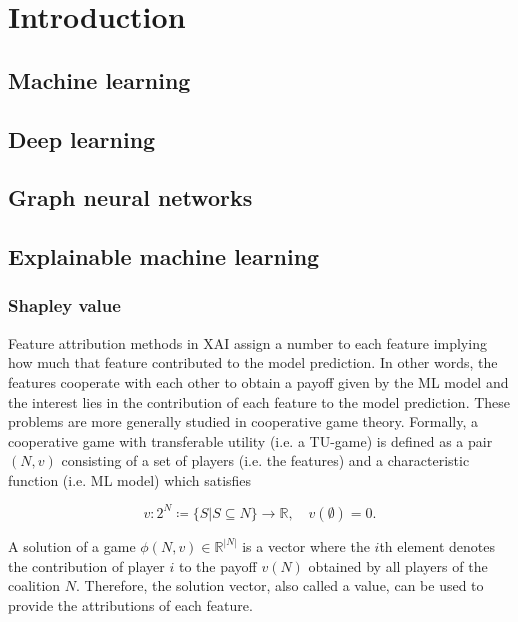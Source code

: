 \chapter{Introduction}


\section{Machine learning}

\section{Deep learning}


\section{Graph neural networks}


\section{Explainable machine learning}

\subsection{Shapley value}
\label{subsec:shapley_value}

Feature attribution methods in XAI assign a number to each feature implying how
much that feature contributed to the model prediction.\cite{merrick2020explanation}
In other words, the features cooperate with each other to obtain a payoff given
by the ML model and the interest lies in the contribution of each feature to the
model prediction. These problems are more generally studied in cooperative game
theory. Formally, a cooperative game with transferable utility (i.e. a TU-game) is
defined as a pair $(N, v)$ consisting of a set of players (i.e. the features)
and a characteristic function (i.e. ML model) which satisfies\cite{zhang2022gstarx}


\begin{equation}
	v: 2^N \coloneqq \{S | S \subseteq N\} \rightarrow \mathbb{R}, \quad v\left(\emptyset\right) = 0.
\end{equation}


A solution of a game $\phi(N, v) \in \mathbb{R}^{|N|}$ is a vector where the $i$th element
denotes the contribution of player $i$ to the payoff $v(N)$ obtained by all players
of the coalition $N$.\cite{zhang2022gstarx} Therefore, the solution vector,
also called a value, can be used to provide the attributions of each feature.



